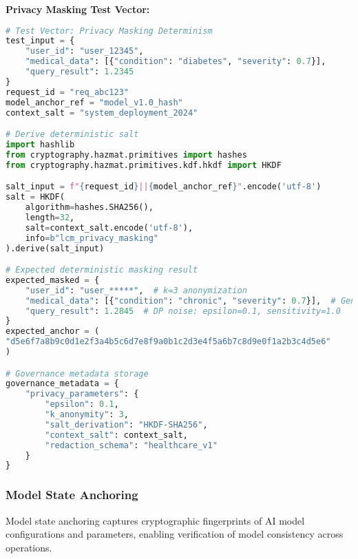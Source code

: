 \documentclass[12pt,a4paper]{article}
\begin{document}
\textbf{Privacy Masking Test Vector:}

\begin{lstlisting}[language=Python, caption=Privacy Masking Determinism Test]
# Test Vector: Privacy Masking Determinism
test_input = {
    "user_id": "user_12345",
    "medical_data": [{"condition": "diabetes", "severity": 0.7}],
    "query_result": 1.2345
}
request_id = "req_abc123"
model_anchor_ref = "model_v1.0_hash"
context_salt = "system_deployment_2024"

# Derive deterministic salt
import hashlib
from cryptography.hazmat.primitives import hashes
from cryptography.hazmat.primitives.kdf.hkdf import HKDF

salt_input = f"{request_id}||{model_anchor_ref}".encode('utf-8')
salt = HKDF(
    algorithm=hashes.SHA256(),
    length=32,
    salt=context_salt.encode('utf-8'),
    info=b"lcm_privacy_masking"
).derive(salt_input)

# Expected deterministic masking result
expected_masked = {
    "user_id": "user_*****",  # k=3 anonymization
    "medical_data": [{"condition": "chronic", "severity": 0.7}],  # Generalization
    "query_result": 1.2845  # DP noise: epsilon=0.1, sensitivity=1.0
}
expected_anchor = (
"d5e6f7a8b9c0d1e2f3a4b5c6d7e8f9a0b1c2d3e4f5a6b7c8d9e0f1a2b3c4d5e6"
)

# Governance metadata storage
governance_metadata = {
    "privacy_parameters": {
        "epsilon": 0.1,
        "k_anonymity": 3,
        "salt_derivation": "HKDF-SHA256",
        "context_salt": context_salt,
        "redaction_schema": "healthcare_v1"
    }
}
\end{lstlisting}

\subsubsection{Model State Anchoring}

Model state anchoring captures cryptographic fingerprints of AI model configurations and parameters, enabling verification of model consistency across operations.
\end{document}
